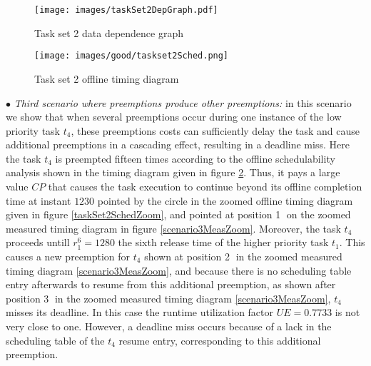 \documentclass[conference,compsocconf]{IEEEtran}
\begin{document}
\begin{figure}[h]
\begin{center}    
	\texttt{[image: images/taskSet2DepGraph.pdf]}
	\caption{\label{taskSet2DepGraph} Task set 2 data dependence graph}
 \end{center}   
\end{figure} 


\begin{center}
\begin{figure}[h]
\texttt{[image: images/good/taskset2Sched.png]}
  \caption{ Task set 2 offline timing diagram}
\label{taskSet2Sched}
\end{figure}
\end{center}




$\bullet$ {\em Third scenario where preemptions produce other preemptions:} in this scenario we show that when several preemptions occur during one instance of the low priority task $t_4$, these preemptions costs can sufficiently delay the task and cause additional preemptions in a cascading effect, resulting in a deadline miss.  
Here the task $t_4$ is preempted fifteen times according to the offline schedulability analysis shown in the timing diagram given in figure \ref{taskSet2Sched}. Thus, it pays a large value $CP$ that causes the task execution to continue beyond its offline completion time at instant $1230$ pointed by the circle in the zoomed offline timing diagram given in figure \ref{taskSet2SchedZoom}, and pointed at position \textcircled{1} on the zoomed measured timing diagram in figure \ref{scenario3MeasZoom}. Moreover, the task $t_4$ proceeds untill $r_1^6=1280$ the sixth release time of the higher priority task $t_1$. This causes a new preemption for $t_4$ shown at position \textcircled{2} in the zoomed measured timing diagram \ref{scenario3MeasZoom}, and because there is no scheduling table entry afterwards to resume from this additional preemption, as shown after position \textcircled{3} in the zoomed measured timing diagram \ref{scenario3MeasZoom}, $t_4$ misses its deadline. In this case the runtime utilization factor $UE=0.7733$ is not very close to one. However, a deadline miss occurs because of a lack in the scheduling table of the $t_4$ resume entry, corresponding to this additional preemption.       
\end{document}
